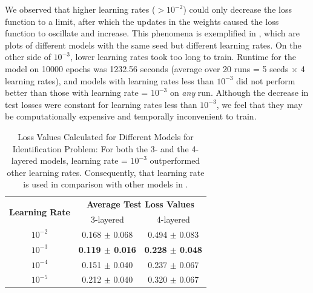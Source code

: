 \documentclass[12pt]{article}
\begin{document}
    We observed that higher learning rates ($>10^{-2}$) could only decrease the loss function to a limit, after which the updates in the weights caused the loss function to oscillate and increase. This phenomena is exemplified in , which are plots of different models with the same seed but different learning rates. On the other side of $10^{-3}$, lower learning rates took too long to train. Runtime for the model on 10000 epochs was 1232.56 seconds (average over 20 runs = 5 seeds $\times$ 4 learning rates), and models with learning rates less than $10^{-3}$ did not perform better than those with learning rate = $10^{-3}$ on \textit{any} run. Although the decrease in test losses were constant for learning rates less than $10^{-3}$, we feel that they may be computationally expensive and temporally inconvenient to train.
    \begin{table}[!htbp]
        \centering
        \caption[Loss Values Calculated for Different Models for Identification Problem]{Loss Values Calculated for Different Models for Identification Problem: For both the 3- and the 4-layered models, learning rate = $10^{-3}$ outperformed other learning rates. Consequently, that learning rate is used in comparison with other models in .}
        \label{tab:Loss Values Calculated for Different Models for Identification Problem}
        \begin{tabular}{c | c | c}
            \hline
            \multirow{2}{*}{\textbf{Learning Rate}} & \multicolumn{2}{c}{\textbf{Average Test Loss Values}} \\
            & 3-layered & 4-layered\\
            \hline
            $10^{-2}$ & 0.168 $\pm$ 0.068 & 0.494 $\pm$ 0.083\\
            $10^{-3}$ & \textbf{0.119 $\pm$ 0.016} & \textbf{0.228 $\pm$ 0.048}\\
            $10^{-4}$ & 0.151 $\pm$ 0.040 & 0.237 $\pm$ 0.067\\
            $10^{-5}$ & 0.212 $\pm$ 0.040 & 0.320 $\pm$ 0.067\\
            \hline
        \end{tabular}
    \end{table}
    
\end{document}
